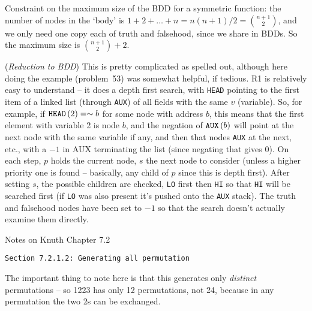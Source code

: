\vskip 0.08in 

\noindent [p 213] Constraint on the maximum size of the BDD for
a symmetric function: the number of nodes in the `body' is
$1 + 2 + \ldots + n = n \left(n + 1\right) / 2 = {n + 1 \choose 2}$,
and we only need one copy each of truth and falsehood, since
we share in BDDs.  So the maximum size is ${n + 1 \choose 2} + 2$.

\vskip 0.08in  ({\it Reduction to BDD})\hfil\break
This is pretty complicated as spelled out, although here doing
the example (problem~53) was somewhat helpful, if tedious.
R1 is relatively easy to understand -- it does a depth first search,
with {\tt HEAD} pointing to the first item of a linked list (through {\tt AUX})
of all fields with the same $v$ (variable).  So, for example,
if ${\tt HEAD}\left(2\right) = \sim b$ for some node with address $b$,
this means that the first element with variable 2 is node $b$,
and the negation of ${\tt AUX}\left(b\right)$ will point at the next node with the same
variable if any, and then that nodes {\tt AUX} at the next, etc., with
a $-1$ in AUX terminating the list (since negating that gives 0).
On each step, $p$ holds the current node, $s$ the next node to consider
(unless a higher priority one is found -- basically, any child of $p$ since
this is depth first).  After setting $s$, the possible children are checked,
{\tt LO} first then {\tt HI} so that {\tt HI} will be searched first (if {\tt LO}
was also present it's pushed onto the {\tt AUX} stack).  The truth and
falsehood nodes have been set to $-1$ so that the search doesn't
actually examine them directly.

\vfil\break
\topglue 0.5in
\centerline{Notes on Knuth Chapter 7.2}
\vskip 0.3in
\centerline{\tt Section 7.2.1.2: Generating all permutation}
\vskip 0.2in

 The important thing to note here is that
this generates only {\it distinct} permutations -- so 1223 has only 12
permutations, not 24, because in any permutation the two 2s can be
exchanged.

